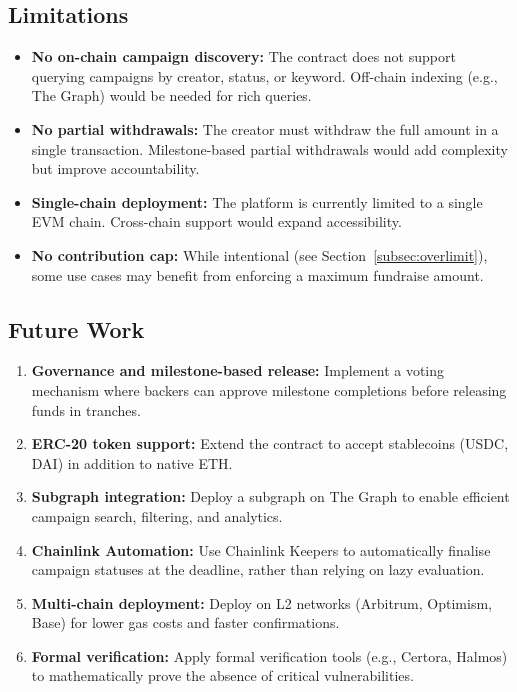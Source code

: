 \subsection{Limitations}

\begin{itemize}[leftmargin=1.5em]
    \item \textbf{No on-chain campaign discovery:} The contract does not support querying campaigns by creator, status, or keyword. Off-chain indexing (e.g., The Graph) would be needed for rich queries.
    \item \textbf{No partial withdrawals:} The creator must withdraw the full amount in a single transaction. Milestone-based partial withdrawals would add complexity but improve accountability.
    \item \textbf{Single-chain deployment:} The platform is currently limited to a single EVM chain. Cross-chain support would expand accessibility.
    \item \textbf{No contribution cap:} While intentional (see Section~\ref{subsec:overlimit}), some use cases may benefit from enforcing a maximum fundraise amount.
\end{itemize}

\subsection{Future Work}

\begin{enumerate}[leftmargin=1.5em]
    \item \textbf{Governance and milestone-based release:} Implement a voting mechanism where backers can approve milestone completions before releasing funds in tranches.
    \item \textbf{ERC-20 token support:} Extend the contract to accept stablecoins (USDC, DAI) in addition to native ETH.
    \item \textbf{Subgraph integration:} Deploy a subgraph on The Graph to enable efficient campaign search, filtering, and analytics.
    \item \textbf{Chainlink Automation:} Use Chainlink Keepers to automatically finalise campaign statuses at the deadline, rather than relying on lazy evaluation.
    \item \textbf{Multi-chain deployment:} Deploy on L2 networks (Arbitrum, Optimism, Base) for lower gas costs and faster confirmations.
    \item \textbf{Formal verification:} Apply formal verification tools (e.g., Certora, Halmos) to mathematically prove the absence of critical vulnerabilities.
\end{enumerate}
